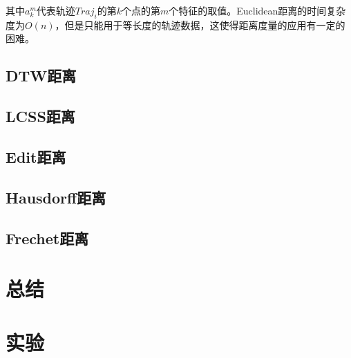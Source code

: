 \documentclass[UTF8, 12pt]{ctexart}
\begin{document}
其中$a_{k}^{m}$代表轨迹$Traj_{i}$的第$k$个点的第$m$个特征的取值。Euclidean距离的时间复杂度为$O(n)$，但是只能用于等长度的轨迹数据，这使得距离度量的应用有一定的困难。

\subsection{DTW距离}


\subsection{LCSS距离}
\subsection{Edit距离}
\subsection{Hausdorff距离}
\subsection{Frechet距离}
\section{总结}

\section{实验}
\end{document}
